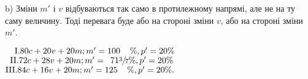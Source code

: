 b) Зміни $m'$ і $v$ відбуваються так само в протилежному напрямі,
але не на ту саму величину. Тоді перевага буде або на
стороні зміни $v$, або на стороні зміни $m'$.
\begin{center}
$\phantom{II}\text{I.} 80 c + 20 v + 20 m; m' = 100\phantom{\sfrac{3}{7}}\%, p' = 20\%$
$\phantom{I}\text{II.}72 c + 28 v + 20 m; m' = \phantom{0}71\sfrac{3}{7}\%, p' = 20\%$
$\text{III.} 84 c + 16 v + 20 m; m' = 125\phantom{\sfrac{3}{7}}\%, p' = 20\%.$
\end{center}
